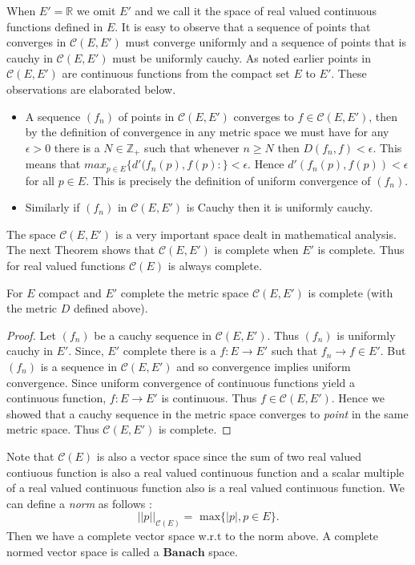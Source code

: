 When $E' = \mathbb{R}$ we omit $E'$ and we call it the space of real valued continuous functions
defined in $E$. 
It is easy to observe that a sequence of points that converges in $\mathcal{C}\left(E,E'\right)$
must converge uniformly and a sequence of points that is cauchy in $\mathcal{C}\left(E,E'\right)$
must be uniformly cauchy. As noted earlier points in $\mathcal{C}\left(E,E'\right)$ are continuous
functions from the compact set $E$ to $E'$. These observations are elaborated below.
\begin{itemize}
    \item A sequence $\left(f_n\right)$ of points in $\mathcal{C}\left(E,E'\right)$ converges to $f
	\in \mathcal{C}\left(E,E'\right)$, then by the definition of convergence in any metric space
	we must have for any $\epsilon > 0$ there is a $N \in \mathbb{Z}_+$ such that whenever $n
	\geq N$ then $D(f_n,f) < \epsilon$. This means that $max_{p \in E}
	\left.\lbrace d'(f_n(p),f(p) : \rbrace\right. < \epsilon$. Hence $d'(f_n(p),f(p)) < \epsilon$
	for all $p \in E$. This is precisely the definition of uniform convergence of 
	$\left(f_n\right)$. 
    \item Similarly if $\left(f_n\right)$ in $\mathcal{C}\left(E,E'\right)$ is Cauchy then it is
	uniformly cauchy.
\end{itemize}
The space $\mathcal{C}\left(E,E'\right)$ is a very important space dealt in mathematical analysis.
The next Theorem shows that $\mathcal{C}\left(E,E'\right)$ is complete when $E'$ is complete. Thus
for real valued functions $\mathcal{C}\left(E\right)$ is always complete.
\begin{Theorem}[name=Completeness of the space of continuous functions $\mathcal{C}$]
    For $E$ compact and $E'$ complete the metric space $\mathcal{C}\left(E,E'\right)$ is complete
    (with the metric $D$ defined above).
\end{Theorem}
\begin{proof}
    Let $\left(f_n\right)$ be a cauchy sequence in $\mathcal{C}\left(E,E'\right)$. Thus 
    $\left(f_n\right)$ is uniformly cauchy in $E'$. Since, $E'$ complete there is a $f : E \to E'$
    such that $f_n \to f \in E'$. But $\left( f_n \right)$ is a sequence in 
    $\mathcal{C}\left(E,E'\right)$ and so convergence implies uniform convergence. Since uniform
    convergence of continuous functions yield a continuous function, $f : E \to E'$ is continuous.
    Thus $f \in \mathcal{C}\left(E,E'\right)$. Hence we showed that a cauchy sequence in the metric
    space converges to \emph{point} in the same metric space. Thus $\mathcal{C}\left(E,E'\right)$ is
    complete.
\end{proof}
Note that $\mathcal{C}\left(E\right)$ is also a vector space since the sum of two real valued contiuous
function is also a real valued continuous function and a scalar multiple of a real valued
continuous function also is a real valued continuous function. We can define a \emph{norm} as
follows :
\[ \lvert\lvert p \rvert\rvert _{\mathcal{C}\left(E\right)} = \text{ max
}\left.\lbrace \lvert p \rvert, p \in E \rbrace\right. .\]
Then we have a complete vector space w.r.t to the norm above. A complete normed vector space is
called a $\textbf{Banach}$ space.
